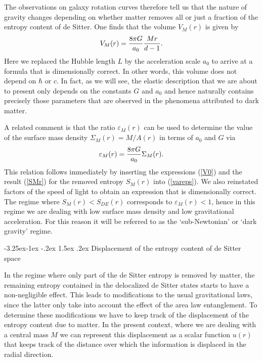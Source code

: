 \documentclass[a4paper,12pt]{article}
\makeatletter
\renewcommand\subsection{\@startsection{subsection}{2}{\z@}%
                                     {-3.25ex\@plus -1ex \@minus -.2ex}%
                                     {1.5ex \@plus .2ex}%
                                     {\normalfont\bfseries}}
\makeatother
\begin{document}
The observations on galaxy rotation curves therefore tell us that the nature of gravity changes depending on whether matter removes all or just a fraction of the entropy content of de Sitter.
One finds that the volume $V_M(r)$ is given by
\begin{equation}
\label{VMr}
V_M(r) = {8\pi G \over a_0} {M r\over d-1} 	.
\end{equation}
Here we replaced the Hubble length $L$ by the acceleration scale $a_0$ to arrive at a formula that is dimensionally correct. In other words, this volume does not depend on $\hbar$ or $c$. In fact, as we will see, the elastic description that we are about to present only depends on the constants $G$ and $a_0$ and hence naturally contains precisely those parameters that are observed in the phenomena attributed to dark matter. 

A related comment is that the ratio $\varepsilon_M(r)$ can be used to determine the value of the surface mass density $\Sigma_M(r) =M/A(r)$ in terms of $a_0$ and $G$ via
\begin{equation}
\label{Sigmaeps}
\varepsilon_M (r)	= {8\pi G\over a_0}   
 \Sigma_M(r) . %
\end{equation}
This relation follows immediately by inserting the expressions (\ref{V0}) and the result 
(\ref{SMr}) for the removed entropy $S_M(r)$  into (\ref{vareps}). We also reinstated factors of the speed of light to obtain an expression that is dimensionally correct.  
 The regime where $S_M(r)< S_{DE}(r)$ corresponds to $\varepsilon_M(r) <1$, hence in this regime we 
 are dealing with low surface mass density and low gravitational acceleration.  
For this reason it will be referred to as the `sub-Newtonian' or `dark gravity' regime. 
 
 
 
  
 \subsection{Displacement of the entropy content of de Sitter space}
 
In the regime where only part of the de Sitter entropy is removed by matter, the remaining entropy contained in the delocalized de Sitter states starts to have a non-negligible effect. This leads to modifications to the usual gravitational laws, since the latter only take into account the effect of the area law entanglement. To determine these modifications we have to keep track of the displacement of the entropy content due to matter.  In the present context, where we are dealing with a central mass $M$ we can represent this displacement as a scalar function $u(r)$ that keeps track of the distance over which the 
information is displaced in the radial direction. 
\end{document}
